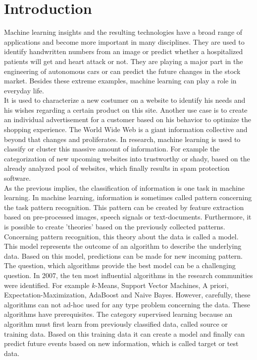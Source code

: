 \chapter{Introduction}
Machine learning insights and the resulting technologies have a broad range of applications and become more important in many disciplines.
They are used to identify handwritten numbers from an image or predict whether a hospitalized patients will get and heart attack or not. 
They are playing a major part in the engineering of autonomous cars or can predict the future changes in the stock market.
Besides these extreme examples, machine learning can play a role in everyday life.\\
It is used to characterize a new costumer on a website to identify his needs and his wishes regarding a certain product on this site.
Another use case is to create an individual advertisement for a customer based on his behavior to optimize the shopping experience.
The World Wide Web is a giant information collective and beyond that changes and proliferates.
In research, machine learning is used to classify or cluster this massive amount of information.
For example the categorization of new upcoming websites into trustworthy or shady, based on the already analyzed pool of websites, which finally results in spam protection software.\\
As the previous implies, the classification of information is one task in machine learning.
In machine learning, information is sometimes called pattern concerning the task pattern recognition.
This pattern can be created by feature extraction based on pre-processed images, speech signals or text-documents.
Furthermore, it is possible to create 'theories' based on the previously collected patterns.
Concerning pattern recognition, this theory about the data is called a model. 
This model represents the outcome of an algorithm to describe the underlying data.
Based on this model, predictions can be made for new incoming pattern.\\
The question, which algorithms provide the best model can be a challenging question.
In 2007, the ten most influential algorithms in the research communities were identified.
For example $k$-Means, Support Vector Machines, A priori, Expectation-Maximization, AdaBoost and Naive Bayes.
However, carefully, these algorithms can not ad-hoc used for any type problem concerning the data.
These algorithms have prerequisites.
The category supervised learning because an algorithm must first learn from previously classified data, called source or training data. Based on this training data it can create a model and finally can predict future events based on new information, which is called target or test data.

